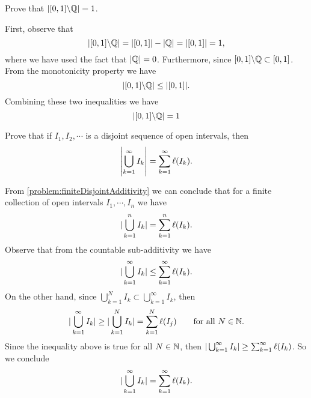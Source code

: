 \begin{problem}
	Prove that $ |[0,1] \backslash \mathbb{Q}| = 1 $.
\end{problem}
\begin{solution}
	First, observe that
	\[ |[0,1]\backslash\mathbb{Q}| = |[0,1]| - |\mathbb{Q}| = |[0,1]| = 1, \]
	where we have used the fact that $ |\mathbb{Q}| = 0 $. Furthermore, since $ [0,1]\backslash \mathbb{Q} \subset [0,1] $. From the monotonicity property we have
	\[ |[0,1] \backslash \mathbb{Q}| \leq |[0,1]|. \]
	Combining these two inequalities we have
	\[ |[0,1]\backslash\mathbb{Q}| = 1 \]
\end{solution}

\begin{problem}
	Prove that if $ I_1,I_2,\cdots $ is a disjoint sequence of open intervals, then 
	\[ \left|\bigcup_{k=1}^\infty I_k\right| = \sum_{k=1}^{\infty} \ell(I_k). \]
\end{problem}
\begin{solution}
	From \autoref{problem:finiteDisjointAdditivity} we can conclude that for a finite collection of open intervals $ I_1,\cdots,I_n $ we have
	\[ |\bigcup_{k=1}^n I_k| = \sum_{k=1}^{n} \ell(I_k). \]
	Observe that from the countable sub-additivity we have
	\[ |\bigcup_{k=1}^\infty I_k| \leq \sum_{k=1}^{\infty} \ell(I_k). \]
	On the other hand, since $ \bigcup_{k=1}^N I_k \subset \bigcup_{k=1}^{\infty} I_k $, then 
	\[ |\bigcup_{k=1}^\infty I_k| \geq |\bigcup_{k=1}^N I_k|  = \sum_{k=1}^{N}\ell(I_j) \qquad \text{for all $ N \in \mathbb{N} $}.  \]
	Since the inequality above is true for all $ N\in \mathbb{N} $, then $ |\bigcup_{k=1}^\infty I_k| \geq \sum_{k=1}^{\infty} \ell(I_k) $. So we conclude 
	\[ |\bigcup_{k=1}^\infty I_k| = \sum_{k=1}^{\infty} \ell(I_k). \]
\end{solution}


